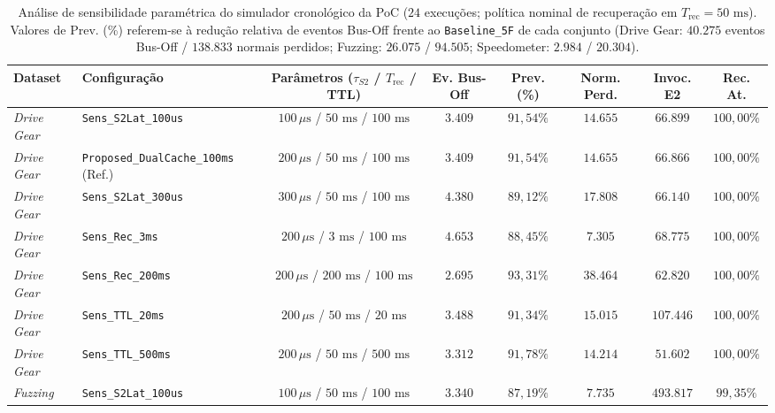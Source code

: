 \documentclass[conference]{IEEEtran}
\begin{document}
\begin{table}[t]
\centering
\caption{Análise de sensibilidade paramétrica do simulador cronológico da PoC ($24$ execuções; política nominal de recuperação em $T_{\text{rec}} = 50\text{ ms}$). Valores de Prev. (\%) referem-se à redução relativa de eventos Bus-Off frente ao \texttt{Baseline\_5F} de cada conjunto (Drive Gear: $40.275$ eventos Bus-Off / $138.833$ normais perdidos; Fuzzing: $26.075$ / $94.505$; Speedometer: $2.984$ / $20.304$).}
\label{tab:poc_sensitivity}
\scriptsize
\setlength{\tabcolsep}{4pt}
\renewcommand{\arraystretch}{1.12}
\begin{tabular}{@{}llcccccc@{}}
\toprule
\textbf{Dataset} & \textbf{Configuração} & \textbf{Parâmetros ($\tau_{S2}$ / $T_{\text{rec}}$ / TTL)} & \textbf{Ev. Bus-Off} & \textbf{Prev. (\%)} & \textbf{Norm. Perd.} & \textbf{Invoc. E2} & \textbf{Rec. At.} \\
\midrule
\textit{Drive Gear} & \texttt{Sens\_S2Lat\_100us} & $100\,\mu\text{s}$ / $50\text{ ms}$ / $100\text{ ms}$ & $3.409$ & $91{,}54\%$ & $14.655$ & $66.899$ & $100{,}00\%$ \\
\textit{Drive Gear} & \texttt{Proposed\_DualCache\_100ms} (Ref.) & $200\,\mu\text{s}$ / $50\text{ ms}$ / $100\text{ ms}$ & $3.409$ & $91{,}54\%$ & $14.655$ & $66.866$ & $100{,}00\%$ \\
\textit{Drive Gear} & \texttt{Sens\_S2Lat\_300us} & $300\,\mu\text{s}$ / $50\text{ ms}$ / $100\text{ ms}$ & $4.380$ & $89{,}12\%$ & $17.808$ & $66.140$ & $100{,}00\%$ \\
\textit{Drive Gear} & \texttt{Sens\_Rec\_3ms} & $200\,\mu\text{s}$ / $3\text{ ms}$ / $100\text{ ms}$ & $4.653$ & $88{,}45\%$ & $7.305$ & $68.775$ & $100{,}00\%$ \\
\textit{Drive Gear} & \texttt{Sens\_Rec\_200ms} & $200\,\mu\text{s}$ / $200\text{ ms}$ / $100\text{ ms}$ & $2.695$ & $93{,}31\%$ & $38.464$ & $62.820$ & $100{,}00\%$ \\
\textit{Drive Gear} & \texttt{Sens\_TTL\_20ms} & $200\,\mu\text{s}$ / $50\text{ ms}$ / $20\text{ ms}$ & $3.488$ & $91{,}34\%$ & $15.015$ & $107.446$ & $100{,}00\%$ \\
\textit{Drive Gear} & \texttt{Sens\_TTL\_500ms} & $200\,\mu\text{s}$ / $50\text{ ms}$ / $500\text{ ms}$ & $3.312$ & $91{,}78\%$ & $14.214$ & $51.602$ & $100{,}00\%$ \\
\midrule
\textit{Fuzzing} & \texttt{Sens\_S2Lat\_100us} & $100\,\mu\text{s}$ / $50\text{ ms}$ / $100\text{ ms}$ & $3.340$ & $87{,}19\%$ & $7.735$ & $493.817$ & $99{,}35\%$ \\

\end{tabular}
\end{table}
\end{document}

